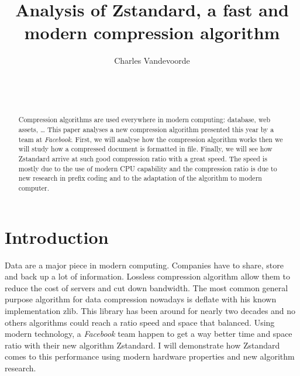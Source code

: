 \documentclass{sig-alternate-05-2015}
\begin{document}
\toappear

\title{Analysis of Zstandard, a fast and modern compression algorithm}

\author{
\alignauthor
Charles Vandevoorde\\
       \\
       \\
       \\
}

\maketitle

\begin{abstract}
    Compression algorithms are used everywhere in modern computing: database, web assets, \ldots
    This paper analyses a new compression algorithm presented this year by a team at
    \textit{Facebook}. First, we will analyse how the compression algorithm works then we will study
    how a compressed document is formatted in file. Finally, we will see how Zstandard arrive at
    such good compression ratio with a great speed. The speed is mostly due to the use of modern
    CPU capability and the compression ratio is due to new research in prefix coding and to the
    adaptation of the algorithm to modern computer.

\end{abstract}


\section{Introduction}
    Data are a major piece in modern computing. Companies have to share, store and back up a
    lot of information. Lossless compression algorithm allow them to reduce the cost of servers and
    cut down bandwidth. The most common general purpose algorithm for data compression nowadays is
    deflate with his known implementation zlib.  This library has been around for nearly two decades
    and no others algorithms could reach a ratio speed and space that balanced. Using modern
    technology, a \textit{Facebook} team happen to get a way better time and space ratio with their
    new algorithm Zstandard. I will demonstrate how Zstandard comes to this performance using modern
    hardware properties and new algorithm research.
\end{document}
